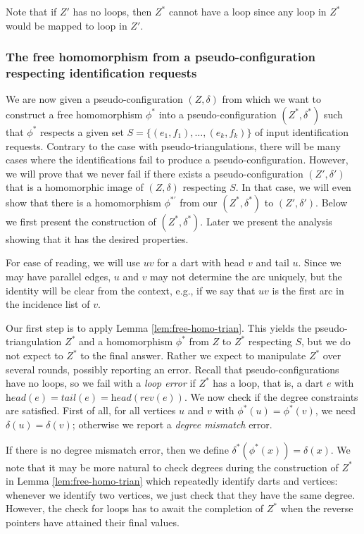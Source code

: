 \documentclass[10pt,a4paper]{article}
\def\head{\textit{head}}
\def\tail{\textit{tail}}
\def\reverse{\textit{rev}}
\begin{document}
Note that if $Z'$ has no loops, then $Z^*$ cannot have a loop since any loop in $Z^*$ would be mapped to loop in $Z'$.





\subsubsection{The free homomorphism from a pseudo-configuration respecting identification requests}
\label{subsub:homomorphism-conf}

We are now given a pseudo-configuration $(Z,\delta)$ from
which we want to construct a free homomorphism $\phi^*$ into a pseudo-configuration $(Z^*,\delta^*)$ such that $\phi^*$ 
respects a given set $S=\{(e_1,f_1),\ldots, (e_k,f_k)\}$ of input identification requests. Contrary to 
the case with pseudo-triangulations, there will be many cases where the identifications fail to produce a pseudo-configuration.
However, we will prove that we never fail if there exists a pseudo-configuration $(Z',\delta')$ that is a homomorphic image of $(Z,\delta)$ respecting $S$. In that case, we will even show that there is a homomorphism $\phi^{*\prime}$ from
our $(Z^*,\delta^*)$ to $(Z',\delta')$.
Below we first present the construction of 
$(Z^*,\delta^*)$. Later we present the analysis showing that it has the desired properties.

For ease of reading, we will use $uv$ for a dart with head $v$ and tail $u$. Since we may have parallel edges, $u$ and $v$ may not determine the arc uniquely, but the identity will be clear from the context, e.g., if we say that $uv$ is the first arc in the incidence list of $v$.

Our first step is to apply Lemma \ref{lem:free-homo-trian}. This yields 
the pseudo-triangulation $Z^*$ and a homomorphism $\phi^*$ from $Z$ to $Z^*$ respecting $S$, but we do not expect to $Z^*$ to the final answer. Rather we expect to manipulate $Z^*$ over several rounds, possibly reporting an error.
Recall that pseudo-configurations have no loops, so we fail with a \emph{loop error} if $Z^*$ has a loop, that is, a dart $e$ with $\head(e)=\tail(e)=\head(\reverse(e))$.
We now check if the degree
constraints are satisfied. First of all, for all vertices $u$ and $v$ with
$\phi^*(u)=\phi^*(v)$, we need
$\delta(u)=\delta(v)$; otherwise we report a \emph{degree mismatch} error.

If there is no
degree mismatch error, then we define $\delta^*(\phi^*(x))=\delta(x)$.
We note that it may be more natural to check degrees during the construction of $Z^*$ in Lemma \ref{lem:free-homo-trian} which repeatedly identify darts and vertices: whenever we identify two vertices, we just check that they have the same degree. However, the check for loops has to await the completion of $Z^*$ when the reverse pointers have attained their final values.
\end{document}
